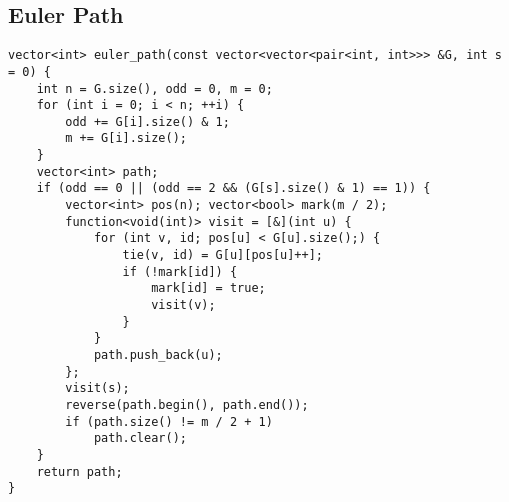 \documentclass[landscape, 8pt, a4paper, oneside]{extarticle}
\begin{document}
\begin{multicols}{3}
\subsection{Euler Path}
\begin{verbatim}
vector<int> euler_path(const vector<vector<pair<int, int>>> &G, int s = 0) {
    int n = G.size(), odd = 0, m = 0;
    for (int i = 0; i < n; ++i) {
        odd += G[i].size() & 1;
        m += G[i].size();
    }
    vector<int> path;
    if (odd == 0 || (odd == 2 && (G[s].size() & 1) == 1)) {
        vector<int> pos(n); vector<bool> mark(m / 2);
        function<void(int)> visit = [&](int u) {
            for (int v, id; pos[u] < G[u].size();) {
                tie(v, id) = G[u][pos[u]++];
                if (!mark[id]) {
                    mark[id] = true;
                    visit(v);
                }
            }
            path.push_back(u);
        };
        visit(s);
        reverse(path.begin(), path.end());
        if (path.size() != m / 2 + 1)
            path.clear();
    }
    return path;
}
\end{verbatim}

\end{multicols}
\end{document}
